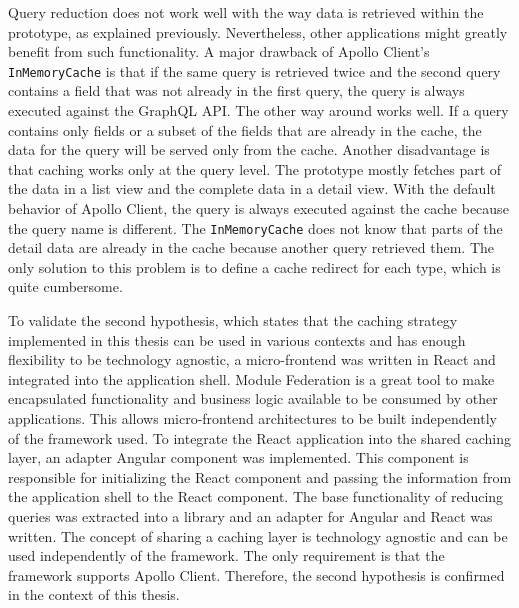 \bigskip

\noindent Query reduction does not work well with the way data is retrieved within the prototype, as explained previously. Nevertheless, other applications might greatly benefit from such functionality. A major drawback of Apollo Client's \texttt{InMemoryCache} is that if the same query is retrieved twice and the second query contains a field that was not already in the first query, the query is always executed against the GraphQL \ac{API}. The other way around works well. If a query contains only fields or a subset of the fields that are already in the cache, the data for the query will be served only from the cache. Another disadvantage is that caching works only at the query level. The prototype mostly fetches part of the data in a list view and the complete data in a detail view. With the default behavior of Apollo Client, the query is always executed against the cache because the query name is different. The \texttt{InMemoryCache} does not know that parts of the detail data are already in the cache because another query retrieved them. The only solution to this problem is to define a cache redirect for each type, which is quite cumbersome.

\bigskip

\noindent To validate the second hypothesis, which states that the caching strategy implemented in this thesis can be used in various contexts and has enough flexibility to be technology agnostic, a micro-frontend was written in React and integrated into the application shell. Module Federation is a great tool to make encapsulated functionality and business logic available to be consumed by other applications. This allows micro-frontend architectures to be built independently of the framework used. To integrate the React application into the shared caching layer, an adapter Angular component was implemented. This component is responsible for initializing the React component and passing the information from the application shell to the React component. The base functionality of reducing queries was extracted into a library and an adapter for Angular and React was written. The concept of sharing a caching layer is technology agnostic and can be used independently of the framework. The only requirement is that the framework supports Apollo Client. Therefore, the second hypothesis is confirmed in the context of this thesis.
